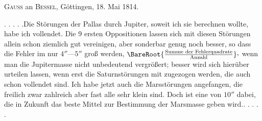 \par{}\bigskip
\begin{center}
\textsc{Gauss} an \textsc{Bessel}, Göttingen, 18. Mai 1814.
\end{center}
\noindent\hspace*{\parindent}. . . . .\quad Die Störungen der Pallas durch Jupiter, soweit ich sie berechnen wollte, habe ich vollendet. Die 9 ersten Oppositionen lassen sich mit diesen Störungen allein schon ziemlich gut vereinigen, aber sonderbar genug noch  besser, so dass die Fehler im  nur \(4''\text{—}5''\) groß werden, \(\BareRoot{\frac{\text{Summe der Fehlerquadrate}}{\text{Anzahl}}}\mathpunct{\raisebox{.45ex}{,}}\) wenn man die Jupitermasse nicht unbedeutend vergrößert; besser wird sich hierüber urteilen lassen, wenn erst die Saturnstörungen mit zugezogen werden, die auch schon vollendet sind. Ich habe jetzt auch die Marsstörungen angefangen, die freilich zwar zahlreich aber fast alle sehr klein sind. Doch ist eine von \(10''\) dabei, die in Zukunft das beste Mittel zur Bestimmung der Marsmasse geben wird.\quad . . . . .
\par
